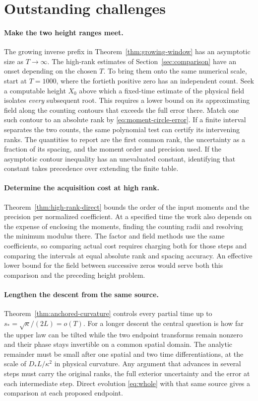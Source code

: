 \section{Outstanding challenges}\label{sec:frontier}

\paragraph{Make the two height ranges meet.}
The growing inverse prefix in Theorem~\ref{thm:growing-window} has an
asymptotic size as \(T\to\infty\). The high-rank estimates of
Section~\ref{sec:comparison} have an onset depending on the chosen
\(T\). To bring them onto the same numerical scale, start at \(T=1000\),
where the fortieth positive zero has an independent count. Seek a
computable height \(X_0\) above which a fixed-time estimate of the
physical field isolates \emph{every} subsequent root. This requires a
lower bound on its approximating field along the counting contours
that exceeds the full error there. Match one such contour to an absolute
rank by \eqref{eq:moment-circle-error}. If a finite interval separates the
two counts, the same polynomial test can certify its intervening ranks.
The quantities to report are the first common rank, the uncertainty as a
fraction of its spacing, and the moment order and precision used. If the
asymptotic contour inequality has an unevaluated constant, identifying
that constant takes precedence over extending the finite table.

\paragraph{Determine the acquisition cost at high rank.}
Theorem~\ref{thm:high-rank-direct} bounds the order of the input moments
and the precision per normalized coefficient. At a specified time the
work also depends on the expense of enclosing the moments, finding the
counting radii and resolving the minimum modulus there. The factor and
field methods use the same coefficients, so comparing actual cost
requires charging both for those steps and comparing the intervals at
equal absolute rank and spacing accuracy. An effective lower bound
for the field between successive zeros would serve both this comparison
and the preceding height problem.

\paragraph{Lengthen the descent from the same source.}
Theorem~\ref{thm:anchored-curvature} controls every partial time up to
\(s_*=\sqrt\kappa/(2L)=o(T)\). For a longer descent the central question
is how far the upper law can be tilted while the two endpoint transforms
remain nonzero and their phase stays invertible on a common spatial
domain. The analytic remainder must be small after one spatial and two
time differentiations, at the scale of \(D_* L/\kappa^2\) in physical
curvature. Any argument that advances in several steps must carry the
original ranks, the full exterior uncertainty and the error at each
intermediate step. Direct evolution \eqref{eq:whole} with that same
source gives a comparison at each proposed endpoint.

